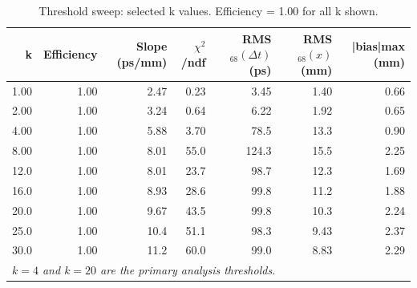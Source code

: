 \begin{table}[htbp]
\centering
\small
\caption{Threshold sweep: selected k values. Efficiency = 1.00 for all k shown.}
\label{tab:threshold_sweep}
\begin{tabular}{rrrrrrr}
\toprule
\textbf{k} & \textbf{Efficiency} & \textbf{Slope (ps/mm)} & \textbf{$\chi^2$/ndf} & \textbf{RMS$_{68}(\Delta t)$ (ps)} & \textbf{RMS$_{68}(x)$ (mm)} & \textbf{|bias|max (mm)} \\
\midrule
1.00 & 1.00 & 2.47 & 0.23 & 3.45 & 1.40 & 0.66 \\
2.00 & 1.00 & 3.24 & 0.64 & 6.22 & 1.92 & 0.65 \\
4.00 & 1.00 & 5.88 & 3.70 & 78.5 & 13.3 & 0.90 \\
8.00 & 1.00 & 8.01 & 55.0 & 124.3 & 15.5 & 2.25 \\
12.0 & 1.00 & 8.01 & 23.7 & 98.7 & 12.3 & 1.69 \\
16.0 & 1.00 & 8.93 & 28.6 & 99.8 & 11.2 & 1.88 \\
20.0 & 1.00 & 9.67 & 43.5 & 99.8 & 10.3 & 2.24 \\
25.0 & 1.00 & 10.4 & 51.1 & 98.3 & 9.43 & 2.37 \\
30.0 & 1.00 & 11.2 & 60.0 & 99.0 & 8.83 & 2.29 \\
\bottomrule
\multicolumn{7}{l}{\small \textit{$k=4$ and $k=20$ are the primary analysis thresholds.}}
\end{tabular}
\end{table}
